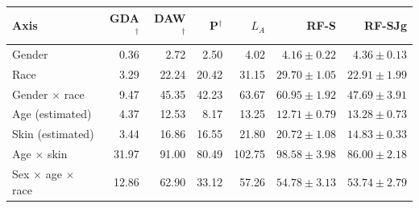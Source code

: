 \begin{tabular}{lrrrrrr}
\toprule
Axis & GDA$^\dagger$ & DAW$^\dagger$ & P$^\dagger$ & $L_A$ & RF-S & RF-SJg \\
\midrule
Gender & 0.36 & 2.72 & 2.50 & 4.02 & $4.16 \pm 0.22$ & $4.36 \pm 0.13$ \\
Race & 3.29 & 22.24 & 20.42 & 31.15 & $29.70 \pm 1.05$ & $22.91 \pm 1.99$ \\
Gender $\times$ race & 9.47 & 45.35 & 42.23 & 63.67 & $60.95 \pm 1.92$ & $47.69 \pm 3.91$ \\
Age (estimated) & 4.37 & 12.53 & 8.17 & 13.25 & $12.71 \pm 0.79$ & $13.28 \pm 0.73$ \\
Skin (estimated) & 3.44 & 16.86 & 16.55 & 21.80 & $20.72 \pm 1.08$ & $14.83 \pm 0.33$ \\
Age $\times$ skin & 31.97 & 91.00 & 80.49 & 102.75 & $98.58 \pm 3.98$ & $86.00 \pm 2.18$ \\
Sex $\times$ age $\times$ race & 12.86 & 62.90 & 33.12 & 57.26 & $54.78 \pm 3.13$ & $53.74 \pm 2.79$ \\
\bottomrule
\end{tabular}
